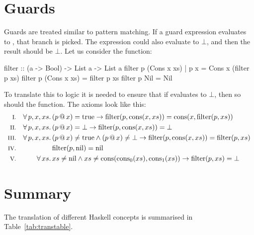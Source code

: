 \section{Guards}

Guards are treated similar to pattern matching. If a guard expression
evaluates to , that branch is picked. The expression could
also evaluate to $\bot$, and then the result should be $\bot$. Let us
consider the  function:

\begin{code}
filter :: (a -> Bool) -> List a -> List a
filter p (Cons x xs) | p x = Cons x (filter p xs)
filter p (Cons x xs)       = filter p xs
filter p Nil               = Nil
\end{code}


To translate this to logic it is needed to ensure that if 
evaluates to $\bot$, then so should the function. The axioms look
like this:
\newcommand\filter[2]{\fn{filter}(#1,#2)}
\begin{align*}
\rom{1} && \faaa{p}{x}{xs} & (\app{p}{x}) = \fn{true}                                  \rightarrow \filter{p}{\cons{x}{xs}} = \cons{x}{\filter{p}{xs}} \\
\rom{2} && \faaa{p}{x}{xs} & (\app{p}{x}) = \bot                                       \rightarrow \filter{p}{\cons{x}{xs}} = \bot \\
\rom{3} && \faaa{p}{x}{xs} & (\app{p}{x}) \neq \fn{true} \wedge (\app{p}{x}) \neq \bot \rightarrow \filter{p}{\cons{x}{xs}} = \filter{p}{xs} \\
\rom{4} &&                 & \filter{p}{\fn{nil}} = \fn{nil} \\
\rom{5} && \fa{xs}         & xs \neq \fn{nil} \wedge xs \neq \uncons{xs} \rightarrow \filter{p}{xs} = \bot
\end{align*}

\section{Summary}

The translation of different Haskell concepts is summarised in
Table~\ref{tab:transtable}.

